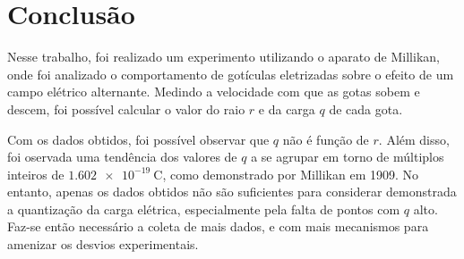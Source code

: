 \section{Conclusão}

Nesse trabalho, foi realizado um experimento utilizando o aparato de Millikan, 
onde foi analizado o comportamento de gotículas eletrizadas sobre o efeito de um 
campo elétrico alternante. 
Medindo a velocidade com que as gotas sobem e descem, 
foi possível calcular o valor do raio $r$ e da carga $q$ de cada gota. 

Com os dados obtidos, foi possível observar que $q$ não é função de $r$. 
Além disso, foi oservada uma tendência dos valores de $q$ a se agrupar 
em torno de múltiplos inteiros de $\qty{1,602e-19}{\coulomb}$, 
como demonstrado por Millikan em 1909. 
No entanto, apenas os dados obtidos não são suficientes para considerar 
demonstrada a quantização da carga elétrica, 
especialmente pela falta de pontos com $q$ alto.
Faz-se então necessário a coleta de mais dados, e com mais mecanismos para 
amenizar os desvios experimentais. 
